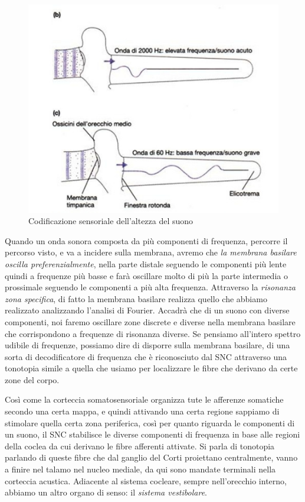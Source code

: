 \documentclass[a4paper,12pt]{article}
\begin{document}
\begin{figure}[H]
\centering
\includegraphics[scale=0.45]{immagine/frequenza.jpg}
\caption{Codificazione sensoriale dell'altezza del suono}
\end{figure} 

Quando un onda sonora composta da più componenti di frequenza, percorre il percorso visto, e va a incidere sulla membrana, avremo che \emph{la membrana basilare oscilla preferenzialmente}, nella parte distale seguendo le componenti più lente quindi a frequenze più basse e farà oscillare molto di più la parte intermedia o prossimale seguendo le componenti a più alta frequenza. Attraverso la \emph{risonanza zona specifica}, di fatto la membrana basilare realizza quello che abbiamo realizzato analizzando l'analisi di Fourier. Accadrà che di un suono con diverse componenti, noi faremo oscillare zone discrete e diverse nella membrana basilare che corrispondono a frequenze di risonanza diverse.  Se pensiamo all'intero spettro udibile di frequenze, possiamo dire di disporre sulla membrana basilare, di una sorta di decodificatore di frequenza che è riconosciuto dal SNC attraverso una tonotopia simile a quella che usiamo per localizzare le fibre che derivano da certe zone del corpo.

Così come la corteccia somatosensoriale organizza tute le afferenze somatiche secondo una certa mappa, e quindi attivando una certa regione sappiamo di stimolare quella certa zona periferica, così per quanto riguarda le componenti di un suono, il SNC stabilisce le diverse componenti di frequenza in base alle regioni della coclea da cui derivano le fibre afferenti attivate. Si parla di tonotopia parlando di queste fibre che dal ganglio del Corti proiettano centralmente, vanno a finire nel talamo nel nucleo mediale, da qui sono mandate terminali nella corteccia acustica. 
Adiacente al sistema cocleare, sempre nell'orecchio interno, abbiamo un altro organo di senso: il \emph{sistema vestibolare}.
\end{document}
